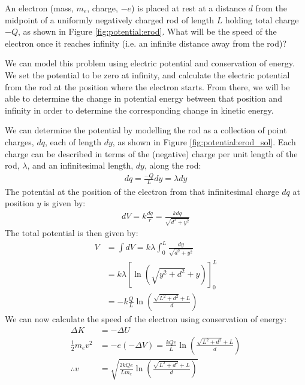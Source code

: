 \question An electron (mass, $m_e$, charge, $-e$) is placed at rest at a distance $d$ from the midpoint of a uniformly negatively charged rod of length $L$ holding total charge $-Q$, as shown in Figure \ref{fig:potential:erod}. What will be the speed of the electron once it reaches infinity (i.e. an infinite distance away from the rod)?
\begin{solution}
We can model this problem using electric potential and conservation of energy. We set the potential to be zero at infinity, and calculate the electric potential from the rod at the position where the electron starts. From there, we will be able to determine the change in potential energy between that position and infinity in order to determine the corresponding change in kinetic energy.

We can determine the potential by modelling the rod as a collection of point charges, $dq$, each of length $dy$, as shown in Figure \ref{fig:potential:erod_sol}.
Each charge can be described in terms of the (negative) charge per unit length of the rod, $\lambda$, and an infinitesimal length, $dy$, along the rod:
\begin{align*}
dq=\frac{-Q}{L}dy=\lambda dy
\end{align*}
The potential at the position of the electron from that infinitesimal charge $dq$ at position $y$ is given by:
\begin{align*}
dV=k\frac{dq}{r}=\frac{kdq}{\sqrt{d^2+y^2}}
\end{align*}
The total potential is then given by:
\begin{align*}
V&=\int dV=k\lambda\int_0^L\frac{dy}{\sqrt{d^2+y^2}}\\
&=k\lambda\left[\ln\left(\sqrt{y^2+d^2} +y \right)  \right]_0^L\\
&=-k\frac{Q}{L}\ln\left(\frac{\sqrt{L^2+d^2} +L}{d} \right) 
\end{align*}
We can now calculate the speed of the electron using conservation of energy:
\begin{align*}
\Delta K &= -\Delta U\\
\frac{1}{2}m_ev^2 &= -e (-\Delta V) = \frac{kQe}{L}\ln\left(\frac{\sqrt{L^2+d^2} +L}{d} \right)   \\
\therefore v &= \sqrt{\frac{2kQe}{Lm_e}\ln\left(\frac{\sqrt{L^2+d^2} +L}{d} \right)}
\end{align*}

\end{solution}


